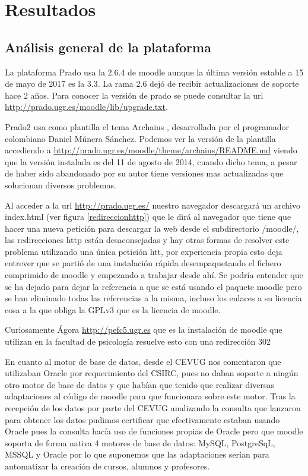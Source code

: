 \chapter{Resultados}

\section{Análisis general de la plataforma}

La plataforma Prado usa la 2.6.4 de moodle aunque la última versión estable a 15 de mayo de 2017 es la 3.3. La rama 2.6 dejó de recibir actualizaciones de soporte hace 2 años. Para conocer la versión de prado se puede consultar la url \url{http://prado.ugr.es/moodle/lib/upgrade.txt}.

\bigskip
Prado2 usa como plantilla el tema Archaius \cite{moodletheme}, desarrollada por el programador colombiano Daniel Múnera Sánchez. Podemos ver la versión de la plantilla accediendo a \url{http://prado.ugr.es/moodle/theme/archaius/README.md} viendo que la versión instalada es del 11 de agosto de 2014, cuando dicho tema, a pesar de haber sido abandonado por su autor tiene versiones mas actualizadas que solucionan diversos problemas.

\bigskip
Al acceder a la url \url{http://prado.ugr.es/} nuestro navegador descargará un archivo index.html (ver figura \ref{redireccionhttp}) que le dirá al navegador que tiene que hacer una nueva petición para descargar la web desde el subdirectorio /moodle/, las redirecciones http están desaconsejadas y hay otras formas de resolver este problema utilizando una única petición htt, por experiencia propia esto deja entrever que se partió de una instalación rápida desempaquetando el fichero comprimido de moodle y empezando a trabajar desde ahí. Se podría entender que se ha dejado para dejar la referencia a que se está usando el paquete moodle pero se han eliminado todas las referencias a la misma, incluso los enlaces a su licencia cosa a la que obliga la GPLv3 que es la licencia de moodle.

\bigskip
Curiosamente Ágora \url{http://pefc5.ugr.es} que es la instalación de moodle que utilizan en la facultad de psicología resuelve esto con una redirección 302

\bigskip
En cuanto al motor de base de datos, desde el CEVUG nos comentaron que utilizaban Oracle por requerimiento del CSIRC, pues no daban soporte a ningún otro motor de base de datos y que habían que tenido que realizar diversas adaptaciones al código de moodle para que funcionara sobre este motor. Tras la recepción de los datos por parte del CEVUG analizando la consulta que lanzaron para obtener los datos pudimos certificar que efectivamente estaban usando Oracle pues la consulta hacía uso de funciones propias de Oracle pero que moodle soporta de forma nativa 4 motores de base de datos: MySQL, PostgreSqL, MSSQL y Oracle por lo que suponemos que las adaptaciones serían para automatizar la creación de cursos, alumnos y profesores.  


